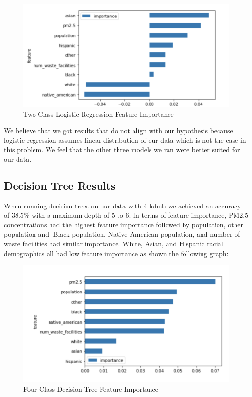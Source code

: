 \documentclass{article}
\begin{document}
\begin{figure}[h]
\caption{Two Class Logistic Regression Feature Importance}
\centering
\includegraphics[scale=0.4]{2ClassLogReg.png}
\end{figure}

We believe that we got results that do not align with our hypothesis because logistic regression assumes linear distribution of our data which is not the case in this problem. We feel that the other three models we ran were better suited for our data. 

\subsection{Decision Tree Results}
\label{decision tree results}

When running decision trees on our data with 4 labels we achieved an accuracy of 38.5\% with a maximum depth of 5 to 6. In terms of feature importance, PM2.5 concentrations had the highest feature importance followed by population, other population and, Black population. Native American population, and number of waste facilities had  similar importance. White, Asian, and Hispanic racial demographics all had low feature importance as shown the following graph: 
\begin{figure}[h]
\caption{Four Class Decision Tree Feature Importance}
\includegraphics[scale=0.45]{4ClassDT.png}
\end{figure}
\end{document}

